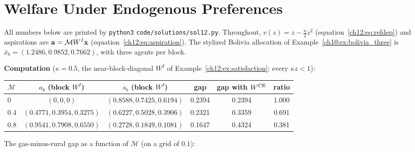 \documentclass[../solutions_manual.tex]{subfiles}
\begin{document}
\ifSubfilesClassLoaded{\setcounter{chapter}{11}}{}%
\setcounter{chapter}{11}%
\chapter{Welfare Under Endogenous Preferences}\label{sol12}
\sloppy

All numbers below are printed by \texttt{python3} \nolinkurl{code/solutions/sol12.py}. Throughout, $v(z) = z - \frac{\kappa}{2}z^2$ (equation~\eqref{ch12:eq:refdep}) and aspirations are $\mathbf{a} = \mathcal{M}W^I\mathbf{x}$ (equation~\eqref{ch12:eq:aspiration}). The stylized Bolivia allocation of Example~\ref{ch10:ex:bolivia_three} is $\bar x_b = (1.2486, 0.9852, 0.7662)$, with three agents per block.

\textbf{Computation} ($\kappa = 0.5$, the near-block-diagonal $W^I$ of Example~\ref{ch12:ex:satisfaction}; every $\kappa z < 1$):
\begin{center}
\small
\begin{tabular}{lccccc}
\toprule
$\mathcal{M}$ & $a_b$ (block $W^I$) & $s_b$ (block $W^I$) & gap & gap with $W^{\text{CE}}$ & ratio \\
\midrule
0   & $(0, 0, 0)$ & $(0.8588, 0.7425, 0.6194)$ & 0.2394 & 0.2394 & 1.000 \\
0.4 & $(0.4771, 0.3954, 0.3275)$ & $(0.6227, 0.5028, 0.3906)$ & 0.2321 & 0.3359 & 0.691 \\
0.8 & $(0.9541, 0.7908, 0.6550)$ & $(0.2728, 0.1849, 0.1081)$ & 0.1647 & 0.4324 & 0.381 \\
\bottomrule
\end{tabular}
\end{center}
The gas-minus-rural gap as a function of $\mathcal{M}$ (on a grid of $0.1$):
\begin{center}
\end{center}
\end{document}
